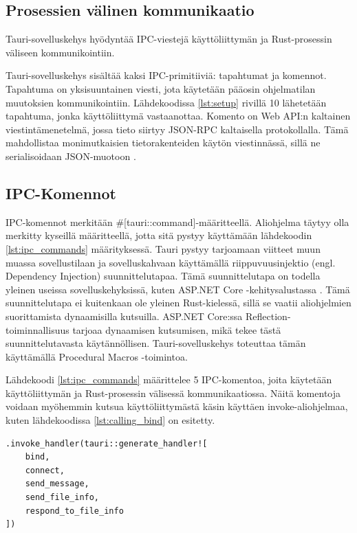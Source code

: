 \documentclass[a4paper,12pt]{article}
\begin{document}
    \subsection{Prosessien välinen kommunikaatio}
    Tauri-sovelluskehys hyödyntää IPC-viestejä käyttöliittymän ja Rust-prosessin väliseen kommunikointiin.

    Tauri-sovelluskehys sisältää kaksi IPC-primitiiviä: tapahtumat ja komennot.
    Tapahtuma on yksisuuntainen viesti, jota käytetään pääosin ohjelmatilan muutoksien kommunikointiin. Lähdekoodissa \ref{lst:setup} rivillä 10 lähetetään tapahtuma, jonka käyttöliittymä vastaanottaa. Komento on Web API:n kaltainen viestintämenetelmä, jossa tieto siirtyy JSON-RPC kaltaisella protokollalla. Tämä mahdollistaa monimutkaisien tietorakenteiden käytön viestinnässä, sillä ne serialisoidaan JSON-muotoon \cite{tauri-app}.

    \subsection{IPC-Komennot}
    IPC-komennot merkitään \#[tauri::command]-määritteellä. Aliohjelma täytyy olla merkitty kyseillä määritteellä, jotta sitä pystyy käyttämään lähdekoodin \ref{lst:ipc_commands} määrityksessä. Tauri pystyy tarjoamaan viitteet muun muassa sovellustilaan ja sovelluskahvaan käyttämällä riippuvuusinjektio (engl. Dependency Injection) suunnittelutapaa. Tämä suunnittelutapa on todella yleinen useissa sovelluskehyksissä, kuten ASP.NET Core -kehitysalustassa \cite{DI_dotnet}. Tämä suunnittelutapa ei kuitenkaan ole yleinen Rust-kielessä, sillä se vaatii aliohjelmien suorittamista dynaamisilla kutsuilla.
    ASP.NET Core:ssa Reflection-toiminnallisuus tarjoaa dynaamisen kutsumisen, mikä tekee tästä suunnittelutavasta käytännöllisen.
    Tauri-sovelluskehys toteuttaa tämän käyttämällä Procedural Macros -toimintoa. 


    Lähdekoodi \ref{lst:ipc_commands} määrittelee 5 IPC-komentoa, joita käytetään käyttöliittymän ja Rust-prosessin välisessä kommunikaatiossa. Näitä komentoja voidaan myöhemmin kutsua käyttöliittymästä käsin käyttäen invoke-aliohjelmaa, kuten lähdekoodissa \ref{lst:calling_bind} on esitetty. \par

    \begin{lstlisting}[caption={IPC-komentojen määritys.}, label={lst:ipc_commands}]
.invoke_handler(tauri::generate_handler![
    bind,
    connect,
    send_message,
    send_file_info,
    respond_to_file_info
])\end{lstlisting}
\end{document}

